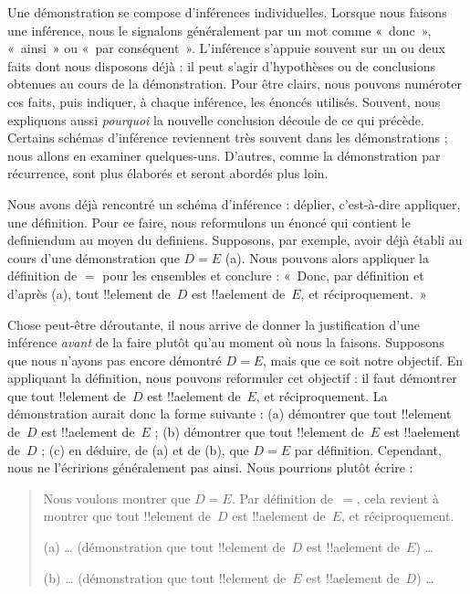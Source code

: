\documentclass[../../../include/open-logic-section]{subfiles}
\begin{document}


Une démonstration se compose d'inférences individuelles. Lorsque
nous faisons une inférence, nous le signalons généralement par un
mot comme «~donc~», «~ainsi~» ou «~par conséquent~». L'inférence
s'appuie souvent sur un ou deux faits dont nous disposons déjà :
il peut s'agir d'hypothèses ou de conclusions obtenues au cours de
la démonstration. Pour être clairs, nous pouvons numéroter ces
faits, puis indiquer, à chaque inférence, les énoncés utilisés.
Souvent, nous expliquons aussi \emph{pourquoi} la nouvelle
conclusion découle de ce qui précède. Certains schémas d'inférence
reviennent très souvent dans les démonstrations ; nous allons en
examiner quelques-uns. D'autres, comme la démonstration par
récurrence, sont plus élaborés et seront abordés plus loin.

Nous avons déjà rencontré un schéma d'inférence : déplier,
c'est-à-dire appliquer, une définition. Pour ce faire, nous
reformulons un énoncé qui contient le definiendum au moyen du
definiens. Supposons, par exemple, avoir déjà établi au cours
d'une démonstration que $D = E$ (a). Nous pouvons alors appliquer
la définition de $=$ pour les ensembles et conclure : «~Donc,
par définition et d'après (a), tout !!{element} de~$D$ est
!!a{element} de~$E$, et réciproquement.~»

Chose peut-être déroutante, il nous arrive de donner la
justification d'une inférence \emph{avant} de la faire plutôt
qu'au moment où nous la faisons. Supposons que nous n'ayons pas
encore démontré $D = E$, mais que ce soit notre objectif. En
appliquant la définition, nous pouvons reformuler cet objectif :
il faut démontrer que tout !!{element} de~$D$ est !!a{element}
de~$E$, et réciproquement. La démonstration aurait donc la forme
suivante : (a) démontrer que tout !!{element} de~$D$ est
!!a{element} de~$E$ ; (b) démontrer que tout !!{element} de~$E$
est !!a{element} de~$D$ ; (c) en déduire, de (a) et de (b), que
$D = E$ par définition. Cependant, nous ne l'écririons
généralement pas ainsi. Nous pourrions plutôt écrire :
\begin{quote}
Nous voulons montrer que $D = E$. Par définition de~$=$, cela
revient à montrer que tout !!{element} de~$D$ est !!a{element}
de~$E$, et réciproquement.

(a) \dots{} (démonstration que tout !!{element} de~$D$ est
!!a{element} de~$E$) \dots

(b) \dots{} (démonstration que tout !!{element} de~$E$ est
!!a{element} de~$D$) \dots
\end{quote}
\end{document}
